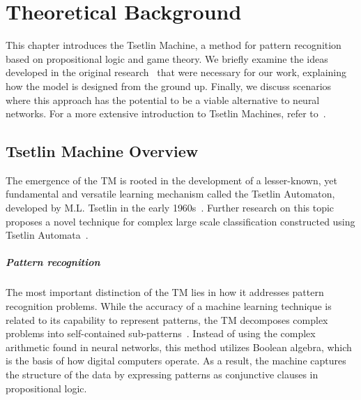 \chapter{Theoretical Background}
\label{chap:theoretical-background}

This chapter introduces the Tsetlin Machine, a method for pattern recognition based on propositional logic and game theory. We briefly examine the ideas developed in the original research~\cite{granmo2021tsetlinmachinegame, glimsdal2021coalescedmultioutputtsetlinmachines} that were necessary for our work, explaining how the model is designed from the ground up. Finally, we discuss scenarios where this approach has the potential to be a viable alternative to neural networks. For a more extensive introduction to Tsetlin Machines, refer to~\cite{granmo2022tsetlinmachinebookchap1, granmo2022tsetlinmachinebookchap2}.

\section{Tsetlin Machine Overview}
The emergence of the TM is rooted in the development of a lesser-known, yet fundamental and versatile learning mechanism called the Tsetlin Automaton, developed by M.L. Tsetlin in the early 1960s~\cite{granmo2021tsetlinmachinegame, tsetlin1961behaviour}. Further research on this topic proposes a novel technique for complex large scale classification constructed using Tsetlin Automata~\cite{granmo2021tsetlinmachinegame}.

\paragraph{Pattern recognition}
The most important distinction of the TM lies in how it addresses pattern recognition problems. While the accuracy of a machine learning technique is related to its capability to represent patterns, the TM decomposes complex problems into self-contained sub-patterns~\cite{granmo2021tsetlinmachinegame}. Instead of using the complex arithmetic found in neural networks, this method utilizes Boolean algebra, which is the basis of how digital computers operate. As a result, the machine captures the structure of the data by expressing patterns as conjunctive clauses in propositional logic.

